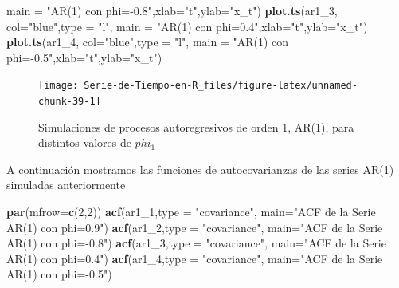\documentclass[12pt,]{krantz}
\makeatletter
\newenvironment{Shaded}{\begin{snugshade}}{\end{snugshade}}
\newcommand{\KeywordTok}[1]{\textcolor[rgb]{0.13,0.29,0.53}{\textbf{#1}}}
\newcommand{\DataTypeTok}[1]{\textcolor[rgb]{0.13,0.29,0.53}{#1}}
\newcommand{\DecValTok}[1]{\textcolor[rgb]{0.00,0.00,0.81}{#1}}
\newcommand{\StringTok}[1]{\textcolor[rgb]{0.31,0.60,0.02}{#1}}
\newcommand{\NormalTok}[1]{#1}
\newenvironment{kframe}{%
\medskip{}
\setlength{\fboxsep}{.8em}
 \def\at@end@of@kframe{}%
 \ifinner\ifhmode%
  \def\at@end@of@kframe{\end{minipage}}%
  \begin{minipage}{\columnwidth}%
 \fi\fi%
 \def\FrameCommand##1{\hskip\@totalleftmargin \hskip-\fboxsep
 \colorbox{shadecolor}{##1}\hskip-\fboxsep
     \hskip-\linewidth \hskip-\@totalleftmargin \hskip\columnwidth}%
 \MakeFramed {\advance\hsize-\width
   \@totalleftmargin\z@ \linewidth\hsize
   \@setminipage}}%
 {\par\unskip\endMakeFramed%
 \at@end@of@kframe}
\renewenvironment{Shaded}{\begin{kframe}}{\end{kframe}}
\theoremstyle{definition}
\theoremstyle{definition}
\theoremstyle{definition}
\theoremstyle{remark}
\makeatother
\begin{document}
\begin{Shaded}
\begin{Highlighting}[]
        \DataTypeTok{main =} \StringTok{"AR(1) con phi=-0.8"}\NormalTok{,}\DataTypeTok{xlab=}\StringTok{"t"}\NormalTok{,}\DataTypeTok{ylab=}\StringTok{"x_t"}\NormalTok{)}
\KeywordTok{plot.ts}\NormalTok{(ar1_}\DecValTok{3}\NormalTok{, }\DataTypeTok{col=}\StringTok{"blue"}\NormalTok{,}\DataTypeTok{type =} \StringTok{"l"}\NormalTok{,}
        \DataTypeTok{main =} \StringTok{"AR(1) con phi=0.4"}\NormalTok{,}\DataTypeTok{xlab=}\StringTok{"t"}\NormalTok{,}\DataTypeTok{ylab=}\StringTok{"x_t"}\NormalTok{)}
\KeywordTok{plot.ts}\NormalTok{(ar1_}\DecValTok{4}\NormalTok{, }\DataTypeTok{col=}\StringTok{"blue"}\NormalTok{,}\DataTypeTok{type =} \StringTok{"l"}\NormalTok{,}
        \DataTypeTok{main =} \StringTok{"AR(1) con phi=-0.5"}\NormalTok{,}\DataTypeTok{xlab=}\StringTok{"t"}\NormalTok{,}\DataTypeTok{ylab=}\StringTok{"x_t"}\NormalTok{)}
\end{Highlighting}
\end{Shaded}

\begin{figure}

{\centering \texttt{[image: Serie-de-Tiempo-en-R\_files/figure-latex/unnamed-chunk-39-1]} 

}

\caption{Simulaciones de procesos autoregresivos de orden 1, AR(1), para distintos valores de $phi_1$}\label{fig:unnamed-chunk-39}
\end{figure}

A continuación mostramos las funciones de autocovarianzas de las series
AR(1) simuladas anteriormente

\begin{Shaded}
\begin{Highlighting}[]
\KeywordTok{par}\NormalTok{(}\DataTypeTok{mfrow=}\KeywordTok{c}\NormalTok{(}\DecValTok{2}\NormalTok{,}\DecValTok{2}\NormalTok{))}
\KeywordTok{acf}\NormalTok{(ar1_}\DecValTok{1}\NormalTok{,}\DataTypeTok{type =} \StringTok{"covariance"}\NormalTok{, }\DataTypeTok{main=}\StringTok{"ACF de la Serie AR(1) con phi=0.9"}\NormalTok{)}
\KeywordTok{acf}\NormalTok{(ar1_}\DecValTok{2}\NormalTok{,}\DataTypeTok{type =} \StringTok{"covariance"}\NormalTok{, }\DataTypeTok{main=}\StringTok{"ACF de la Serie AR(1) con phi=-0.8"}\NormalTok{)}
\KeywordTok{acf}\NormalTok{(ar1_}\DecValTok{3}\NormalTok{,}\DataTypeTok{type =} \StringTok{"covariance"}\NormalTok{, }\DataTypeTok{main=}\StringTok{"ACF de la Serie AR(1) con phi=0.4"}\NormalTok{)}
\KeywordTok{acf}\NormalTok{(ar1_}\DecValTok{4}\NormalTok{,}\DataTypeTok{type =} \StringTok{"covariance"}\NormalTok{, }\DataTypeTok{main=}\StringTok{"ACF de la Serie AR(1) con phi=-0.5"}\NormalTok{)}
\end{Highlighting}
\end{Shaded}
\end{document}
